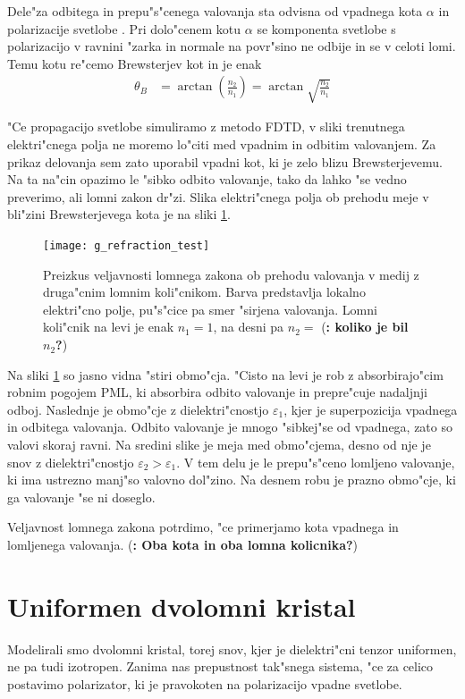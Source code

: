 \documentclass[12pt,twoside,openright,final]{report}
\newcommand{\todo}[1]{(\textbf{\textsmaller{TODO}: #1})}
\begin{document}
Dele"za odbitega in prepu"s"cenega valovanja sta odvisna od vpadnega kota $\alpha$ in polarizacije svetlobe \cite{hecht-optics}. 
Pri dolo"cenem kotu $\alpha$ se komponenta svetlobe s polarizacijo v ravnini "zarka in normale na povr"sino ne odbije in se v celoti lomi. 
Temu kotu re"cemo Brewsterjev kot in je enak
\begin{align}
 \theta_B &= \arctan\left(\frac{n_2}{n_1}\right) = \arctan\sqrt{\frac{n_2}{n_1}}
\end{align}

"Ce propagacijo svetlobe simuliramo z metodo \ac{FDTD}, v sliki trenutnega elektri"cnega polja ne moremo lo"citi med vpadnim in odbitim valovanjem. 
Za prikaz delovanja sem zato uporabil vpadni kot, ki je zelo blizu Brewsterjevemu. 
Na ta na"cin opazimo le "sibko odbito valovanje, tako da lahko "se vedno preverimo, ali lomni zakon dr"zi. 
Slika elektri"cnega polja ob prehodu meje v bli"zini Brewsterjevega kota je na sliki \ref{fig:refraction-test}. 

\begin{figure}[h]
 \centering
 \vspace{-1.2cm}
 \texttt{[image: g\_refraction\_test]}
 \vspace{-1.4cm}
 \caption{Preizkus veljavnosti lomnega zakona ob prehodu valovanja v medij z druga"cnim lomnim koli"cnikom. Barva predstavlja lokalno elektri"cno polje, pu"s"cice pa smer "sirjena valovanja. Lomni koli"cnik na levi je enak $n_1 = 1$, na desni pa $n_2 = $ \todo{koliko je bil $n_2$?}}
 \label{fig:refraction-test}
\end{figure}

Na sliki \ref{fig:refraction-test} so jasno vidna "stiri obmo"cja. 
"Cisto na levi je rob z absorbirajo"cim robnim pogojem \ac{PML}, ki absorbira odbito valovanje in prepre"cuje nadaljnji odboj. 
Naslednje je obmo"cje z dielektri"cnostjo $\varepsilon_1$, kjer je superpozicija vpadnega in odbitega valovanja. 
Odbito valovanje je mnogo "sibkej"se od vpadnega, zato so valovi skoraj ravni. 
Na sredini slike je meja med obmo"cjema, desno od nje je snov z dielektri"cnostjo $\varepsilon_2 > \varepsilon_1$.
V tem delu je le prepu"s"ceno lomljeno valovanje, ki ima ustrezno manj"so valovno dol"zino. 
Na desnem robu je prazno obmo"cje, ki ga valovanje "se ni doseglo. 

Veljavnost lomnega zakona potrdimo, "ce primerjamo kota vpadnega in lomljenega valovanja. \todo{Oba kota in oba lomna kolicnika?}

\section{Uniformen dvolomni kristal}
Modelirali smo dvolomni kristal, torej snov, kjer je dielektri"cni tenzor uniformen, ne pa tudi izotropen. 
Zanima nas prepustnost tak"snega sistema, "ce za celico postavimo polarizator, ki je pravokoten na polarizacijo vpadne svetlobe. 
\end{document}

